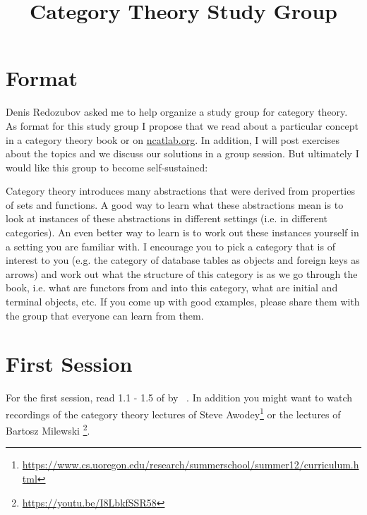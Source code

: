 \documentclass{scrartcl}
\title{Category Theory Study Group}
\date{}
\begin{document}
\maketitle

\section*{Format}
Denis Redozubov asked me to help organize a study group for category theory.
As format for this study group I propose that we read about a particular concept in a category theory book or on \url{ncatlab.org}.
In addition, I will post exercises about the topics and we discuss our solutions in a group session. But ultimately I would like this group to become self-sustained:

Category theory introduces many abstractions that were derived from properties of sets and functions.
A good way to learn what these abstractions mean is to look at instances of these abstractions in different settings (i.e. in different categories).
An even better way to learn is to work out these instances yourself in a setting you are familiar with.
I encourage you to pick a category that is of interest to you (e.g. the category of database tables as objects and foreign keys as arrows) and work out what the structure of this category is as we go through the book, i.e. what are functors from and into this category, what are initial and terminal objects, etc.
If you come up with good examples, please share them with the group that everyone can learn from them.

\section*{First Session}
For the first session, read 1.1 - 1.5 of  by \citeauthor{Awodey2010}~\cite{Awodey2010}. In addition you might want to watch recordings of the category theory lectures of Steve Awodey\footnote{\url{https://www.cs.uoregon.edu/research/summerschool/summer12/curriculum.html}} or the lectures of Bartosz Milewski \footnote{\url{https://youtu.be/I8LbkfSSR58}}.
\end{document}
